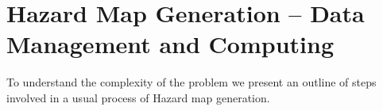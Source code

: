 \documentclass{acm_proc_article-sp}
\begin{document}

\section{ Hazard Map Generation --  Data Management and Computing}\label{HMG}
To understand the complexity of the problem
we present an outline of steps involved in a usual process of Hazard map generation.\\
\end{document}

